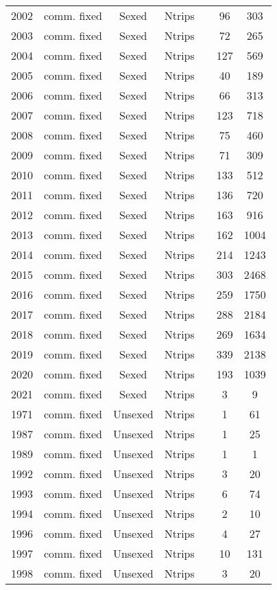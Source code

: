 \begin{longtable}[t]{c>{\centering\arraybackslash}p{3cm}ccccc}
2002 & comm. fixed & Sexed & Ntrips &  & 96 & 303\\
2003 & comm. fixed & Sexed & Ntrips &  & 72 & 265\\
2004 & comm. fixed & Sexed & Ntrips &  & 127 & 569\\
2005 & comm. fixed & Sexed & Ntrips &  & 40 & 189\\
2006 & comm. fixed & Sexed & Ntrips &  & 66 & 313\\
2007 & comm. fixed & Sexed & Ntrips &  & 123 & 718\\
2008 & comm. fixed & Sexed & Ntrips &  & 75 & 460\\
2009 & comm. fixed & Sexed & Ntrips &  & 71 & 309\\
2010 & comm. fixed & Sexed & Ntrips &  & 133 & 512\\
2011 & comm. fixed & Sexed & Ntrips &  & 136 & 720\\
2012 & comm. fixed & Sexed & Ntrips &  & 163 & 916\\
2013 & comm. fixed & Sexed & Ntrips &  & 162 & 1004\\
2014 & comm. fixed & Sexed & Ntrips &  & 214 & 1243\\
2015 & comm. fixed & Sexed & Ntrips &  & 303 & 2468\\
2016 & comm. fixed & Sexed & Ntrips &  & 259 & 1750\\
2017 & comm. fixed & Sexed & Ntrips &  & 288 & 2184\\
2018 & comm. fixed & Sexed & Ntrips &  & 269 & 1634\\
2019 & comm. fixed & Sexed & Ntrips &  & 339 & 2138\\
2020 & comm. fixed & Sexed & Ntrips &  & 193 & 1039\\
2021 & comm. fixed & Sexed & Ntrips &  & 3 & 9\\
1971 & comm. fixed & Unsexed & Ntrips &  & 1 & 61\\
1987 & comm. fixed & Unsexed & Ntrips &  & 1 & 25\\
1989 & comm. fixed & Unsexed & Ntrips &  & 1 & 1\\
1992 & comm. fixed & Unsexed & Ntrips &  & 3 & 20\\
1993 & comm. fixed & Unsexed & Ntrips &  & 6 & 74\\
1994 & comm. fixed & Unsexed & Ntrips &  & 2 & 10\\
1996 & comm. fixed & Unsexed & Ntrips &  & 4 & 27\\
1997 & comm. fixed & Unsexed & Ntrips &  & 10 & 131\\
1998 & comm. fixed & Unsexed & Ntrips &  & 3 & 20\\

\end{longtable}
